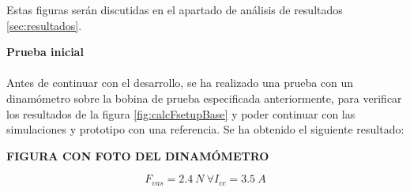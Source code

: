Estas figuras serán discutidas en el apartado de análisis de resultados \ref{sec:resultados}.

\noindent \textbf{Prueba inicial}
\\~\\
\indent Antes de continuar con el desarrollo, se ha realizado una prueba con un dinamómetro sobre la bobina de prueba especificada anteriormente, para verificar los resultados de la figura \ref{fig:calcFsetupBase} y poder continuar con las simulaciones y prototipo con una referencia. Se ha obtenido el siguiente resultado:

\textbf{FIGURA CON FOTO DEL DINAMÓMETRO}

\[F_{vas}=2.4~N~\forall I_{cc}=3.5~A\]
